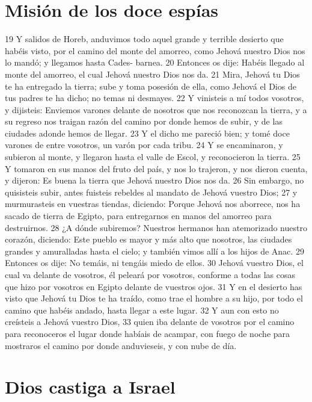 \section{Misión de los doce espías }

19 Y salidos de Horeb, anduvimos todo aquel grande y terrible desierto que habéis visto, por el camino del monte del amorreo, como Jehová nuestro Dios nos lo mandó; y llegamos hasta Cades- barnea.
20 Entonces os dije: Habéis llegado al monte del amorreo, el cual Jehová nuestro Dios nos da.
21 Mira, Jehová tu Dios te ha entregado la tierra; sube y toma posesión de ella, como Jehová el Dios de tus padres te ha dicho; no temas ni desmayes.
22 Y vinisteis a mí todos vosotros, y dijisteis: Enviemos varones delante de nosotros que nos reconozcan la tierra, y a su regreso nos traigan razón del camino por donde hemos de subir, y de las ciudades adonde hemos de llegar.
23 Y el dicho me pareció bien; y tomé doce varones de entre vosotros, un varón por cada tribu.
24 Y se encaminaron, y subieron al monte, y llegaron hasta el valle de Escol, y reconocieron la tierra.
25 Y tomaron en sus manos del fruto del país, y nos lo trajeron, y nos dieron cuenta, y dijeron: Es buena la tierra que Jehová nuestro Dios nos da.
26 Sin embargo, no quisisteis subir, antes fuisteis rebeldes al mandato de Jehová vuestro Dios;
27 y murmurasteis en vuestras tiendas, diciendo: Porque Jehová nos aborrece, nos ha sacado de tierra de Egipto, para entregarnos en manos del amorreo para destruirnos.
28 ¿A dónde subiremos? Nuestros hermanos han atemorizado nuestro corazón, diciendo: Este pueblo es mayor y más alto que nosotros, las ciudades grandes y amuralladas hasta el cielo; y también vimos allí a los hijos de Anac. 
29 Entonces os dije: No temáis, ni tengáis miedo de ellos.
30 Jehová vuestro Dios, el cual va delante de vosotros, él peleará por vosotros, conforme a todas las cosas que hizo por vosotros en Egipto delante de vuestros ojos.
31 Y en el desierto has visto que Jehová tu Dios te ha traído, como trae el hombre a su hijo, por todo el camino que habéis andado, hasta llegar a este lugar.
32 Y aun con esto no creísteis a Jehová vuestro Dios, 
33 quien iba delante de vosotros por el camino para reconoceros el lugar donde habíais de acampar, con fuego de noche para mostraros el camino por donde anduvieseis, y con nube de día.

\section{Dios castiga a Israel }

